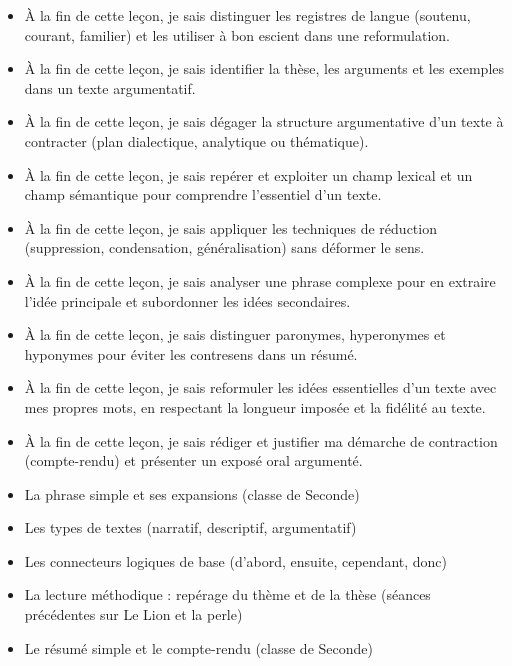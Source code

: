 \documentclass[11pt]{article}
\begin{document}
\begin{objectifs}
\begin{itemize}
\item À la fin de cette leçon, je sais distinguer les registres de langue (soutenu, courant, familier) et les utiliser à bon escient dans une reformulation.
\item À la fin de cette leçon, je sais identifier la thèse, les arguments et les exemples dans un texte argumentatif.
\item À la fin de cette leçon, je sais dégager la structure argumentative d'un texte à contracter (plan dialectique, analytique ou thématique).
\item À la fin de cette leçon, je sais repérer et exploiter un champ lexical et un champ sémantique pour comprendre l'essentiel d'un texte.
\item À la fin de cette leçon, je sais appliquer les techniques de réduction (suppression, condensation, généralisation) sans déformer le sens.
\item À la fin de cette leçon, je sais analyser une phrase complexe pour en extraire l'idée principale et subordonner les idées secondaires.
\item À la fin de cette leçon, je sais distinguer paronymes, hyperonymes et hyponymes pour éviter les contresens dans un résumé.
\item À la fin de cette leçon, je sais reformuler les idées essentielles d'un texte avec mes propres mots, en respectant la longueur imposée et la fidélité au texte.
\item À la fin de cette leçon, je sais rédiger et justifier ma démarche de contraction (compte-rendu) et présenter un exposé oral argumenté.
\end{itemize}
\end{objectifs}

\begin{prerequis}
\begin{itemize}
\item La phrase simple et ses expansions (classe de Seconde)
\item Les types de textes (narratif, descriptif, argumentatif)
\item Les connecteurs logiques de base (d'abord, ensuite, cependant, donc)
\item La lecture méthodique : repérage du thème et de la thèse (séances précédentes sur Le Lion et la perle)
\item Le résumé simple et le compte-rendu (classe de Seconde)
\end{itemize}
\end{prerequis}
\end{document}
